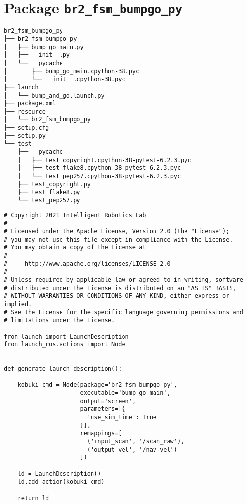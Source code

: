 \section{Package \texttt{br2\_fsm\_bumpgo\_py}}
\label{sec:anex:br2_fsm_bumpgo_py}

 \footnotesize
\begin{tcolorbox}[sharp corners, colframe=gray!80, colback=LightGray, left=0pt, top=0pt, bottom=0pt, title=Package \texttt{br2\_fsm\_bumpgo\_py}]
  \begin{verbatim}
br2_fsm_bumpgo_py
├── br2_fsm_bumpgo_py
│   ├── bump_go_main.py
│   ├── __init__.py
│   └── __pycache__
│       ├── bump_go_main.cpython-38.pyc
│       └── __init__.cpython-38.pyc
├── launch
│   └── bump_and_go.launch.py
├── package.xml
├── resource
│   └── br2_fsm_bumpgo_py
├── setup.cfg
├── setup.py
└── test
    ├── __pycache__
    │   ├── test_copyright.cpython-38-pytest-6.2.3.pyc
    │   ├── test_flake8.cpython-38-pytest-6.2.3.pyc
    │   └── test_pep257.cpython-38-pytest-6.2.3.pyc
    ├── test_copyright.py
    ├── test_flake8.py
    └── test_pep257.py    \end{verbatim}
    \end{tcolorbox}
  \normalsize

 \footnotesize
\begin{tcolorbox}[sharp corners, colframe=gray!80, colback=LightGray, left=0pt, top=0pt, bottom=0pt, title=\texttt{br2\_fsm\_bumpgo\_py/launch/bump\_and\_go.launch.py}]
  \begin{verbatim}
# Copyright 2021 Intelligent Robotics Lab
#
# Licensed under the Apache License, Version 2.0 (the "License");
# you may not use this file except in compliance with the License.
# You may obtain a copy of the License at
#
#     http://www.apache.org/licenses/LICENSE-2.0
#
# Unless required by applicable law or agreed to in writing, software
# distributed under the License is distributed on an "AS IS" BASIS,
# WITHOUT WARRANTIES OR CONDITIONS OF ANY KIND, either express or implied.
# See the License for the specific language governing permissions and
# limitations under the License.

from launch import LaunchDescription
from launch_ros.actions import Node


def generate_launch_description():

    kobuki_cmd = Node(package='br2_fsm_bumpgo_py',
                      executable='bump_go_main',
                      output='screen',
                      parameters=[{
                        'use_sim_time': True
                      }],
                      remappings=[
                        ('input_scan', '/scan_raw'),
                        ('output_vel', '/nav_vel')
                      ])

    ld = LaunchDescription()
    ld.add_action(kobuki_cmd)

    return ld
    \end{verbatim}
    \end{tcolorbox}
  \normalsize

